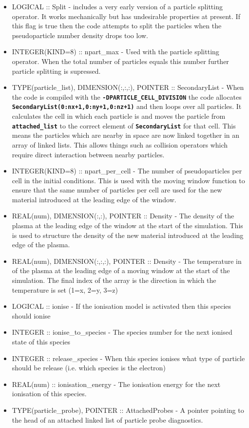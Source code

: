 \documentclass[12pt,a4paper]{article}
\newcommand{\inlinecode}[1]{{\color{warwickred} \bf\texttt{#1}}}
\newcommand{\EPOCH}{{\color{warwickdark}\fontfamily{phv}\selectfont{EPOCH}}}
\begin{document}
\begin{itemize}
\item LOGICAL :: Split - {\EPOCH} includes a very early version of a particle
  splitting operator. It works mechanically but has undesirable properties at
  present. If this flag is true then the code attempts to split the particles
  when the pseudoparticle number density drops too low.
\item INTEGER(KIND=8) :: npart\_max - Used with the particle splitting
  operator. When the total number of particles equals this number further
  particle splitting is supressed.
\item TYPE(particle\_list), DIMENSION(:,:,:), POINTER :: SecondaryList - When the
  code is compiled with the \inlinecode{-DPARTICLE\_CELL\_DIVISION} the code
  allocates \inlinecode{SecondaryList(0:nx+1,0:ny+1,0:nz+1)} and then loops
  over all particles. It calculates the cell in which each particle is and
  moves the particle from \inlinecode{attached\_list} to the correct element of
  \inlinecode{SecondaryList} for that cell. This means the particles which are
  nearby in space are now linked together in an array of linked lists. This
  allows things such as collision operators which require direct interaction
  between nearby particles.
\item INTEGER(KIND=8) :: npart\_per\_cell - The number of pseudoparticles per
  cell in the initial conditions. This is used with the moving window function
  to ensure that the same number of particles per cell are used for the new
  material introduced at the leading edge of the window.
\item REAL(num), DIMENSION(:,:), POINTER :: Density - The density of the plasma
  at the leading edge of the window at the start of the simulation. This is
  used to structure the density of the new material introduced at the leading
  edge of the plasma.
\item REAL(num), DIMENSION(:,:,:), POINTER :: Density - The temperature in of
  the plasma at the leading edge of a moving window at the start of the
  simulation. The final index of the array is the direction in which the
  temperature is set (1=x, 2=y, 3=z)
\item LOGICAL :: ionise - If the ionisation model is activated then this
  species should ionise
\item INTEGER :: ionise\_to\_species - The species number for the next ionised
  state of this species
\item INTEGER :: release\_species - When this species ionises what type of
  particle should be release (i.e. which species is the electron)
\item REAL(num) :: ionisation\_energy - The ionisation energy for the next
  ionisation of this species.
\item TYPE(particle\_probe), POINTER :: AttachedProbes - A pointer pointing to
  the head of an attached linked list of particle probe diagnostics.
\end{itemize}
\end{document}

